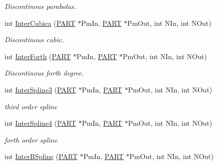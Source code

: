 \begin{DoxyCompactItemize}
\begin{DoxyCompactList}\small\item\em \-Discontinous parabolas. \end{DoxyCompactList}\item 
\hypertarget{classVarData_a795082ee073645d47521f76466f7ed8a}{int \hyperlink{classVarData_a795082ee073645d47521f76466f7ed8a}{\-Inter\-Cubica} (\hyperlink{structPART}{\-P\-A\-R\-T} $\ast$\-Pm\-In, \hyperlink{structPART}{\-P\-A\-R\-T} $\ast$\-Pm\-Out, int \-N\-In, int \-N\-Out)}\label{classVarData_a795082ee073645d47521f76466f7ed8a}

\begin{DoxyCompactList}\small\item\em \-Discontinous cubic. \end{DoxyCompactList}\item 
\hypertarget{classVarData_a0a052e0873439d07b96b568cbf9dd779}{int \hyperlink{classVarData_a0a052e0873439d07b96b568cbf9dd779}{\-Inter\-Forth} (\hyperlink{structPART}{\-P\-A\-R\-T} $\ast$\-Pm\-In, \hyperlink{structPART}{\-P\-A\-R\-T} $\ast$\-Pm\-Out, int \-N\-In, int \-N\-Out)}\label{classVarData_a0a052e0873439d07b96b568cbf9dd779}

\begin{DoxyCompactList}\small\item\em \-Discontinous forth degree. \end{DoxyCompactList}\item 
\hypertarget{classVarData_ab0b4fada6de680561da83cca386ef45f}{int \hyperlink{classVarData_ab0b4fada6de680561da83cca386ef45f}{\-Inter\-Spline3} (\hyperlink{structPART}{\-P\-A\-R\-T} $\ast$\-Pm\-In, \hyperlink{structPART}{\-P\-A\-R\-T} $\ast$\-Pm\-Out, int \-N\-In, int \-N\-Out)}\label{classVarData_ab0b4fada6de680561da83cca386ef45f}

\begin{DoxyCompactList}\small\item\em third order spline \end{DoxyCompactList}\item 
\hypertarget{classVarData_aa9ed52d7528232be32a6b7c503f5783f}{int \hyperlink{classVarData_aa9ed52d7528232be32a6b7c503f5783f}{\-Inter\-Spline4} (\hyperlink{structPART}{\-P\-A\-R\-T} $\ast$\-Pm\-In, \hyperlink{structPART}{\-P\-A\-R\-T} $\ast$\-Pm\-Out, int \-N\-In, int \-N\-Out)}\label{classVarData_aa9ed52d7528232be32a6b7c503f5783f}

\begin{DoxyCompactList}\small\item\em forth order spline \end{DoxyCompactList}\item 
\hypertarget{classVarData_a5aa87310014b0206d554e7f3dacd73a4}{int \hyperlink{classVarData_a5aa87310014b0206d554e7f3dacd73a4}{\-Inter\-B\-Spline} (\hyperlink{structPART}{\-P\-A\-R\-T} $\ast$\-Pm\-In, \hyperlink{structPART}{\-P\-A\-R\-T} $\ast$\-Pm\-Out, int \-N\-In, int \-N\-Out)}\label{classVarData_a5aa87310014b0206d554e7f3dacd73a4}


\end{DoxyCompactItemize}
